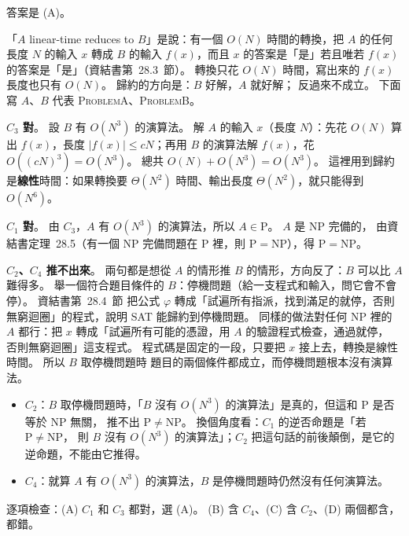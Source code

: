 \begin{pastsoln}
答案是 (A)。

「$A$ linear-time reduces to $B$」是說：有一個 $O(N)$ 時間的轉換，把 $A$ 的任何長度 $N$ 的輸入 $x$
轉成 $B$ 的輸入 $f(x)$，而且 $x$ 的答案是「是」若且唯若 $f(x)$ 的答案是「是」（資結書第~28.3~節）。
轉換只花 $O(N)$ 時間，寫出來的 $f(x)$ 長度也只有 $O(N)$。 歸約的方向是：$B$ 好解，$A$ 就好解；
反過來不成立。 下面寫 $A$、$B$ 代表 \textsc{ProblemA}、\textsc{ProblemB}。

\textbf{$C_3$ 對}。 設 $B$ 有 $O(N^3)$ 的演算法。 解 $A$ 的輸入 $x$（長度 $N$）：先花 $O(N)$ 算出
$f(x)$，長度 $|f(x)| \le cN$；再用 $B$ 的演算法解 $f(x)$，花 $O((cN)^3) = O(N^3)$。 總共
$O(N) + O(N^3) = O(N^3)$。 這裡用到歸約是\textbf{線性}時間：如果轉換要 $\Theta(N^2)$ 時間、輸出長度
$\Theta(N^2)$，就只能得到 $O(N^6)$。

\textbf{$C_1$ 對}。 由 $C_3$，$A$ 有 $O(N^3)$ 的演算法，所以 $A \in \mathrm{P}$。 $A$ 是 NP 完備的，
由資結書定理~28.5（有一個 NP 完備問題在 P 裡，則 $\mathrm{P} = \mathrm{NP}$），得
$\mathrm{P} = \mathrm{NP}$。

\textbf{$C_2$、$C_4$ 推不出來}。 兩句都是想從 $A$ 的情形推 $B$ 的情形，方向反了：$B$ 可以比 $A$
難得多。 舉一個符合題目條件的 $B$：停機問題（給一支程式和輸入，問它會不會停）。 資結書第~28.4~節
把公式 $\varphi$ 轉成「試遍所有指派，找到滿足的就停，否則無窮迴圈」的程式，說明 SAT 能歸約到停機問題。
同樣的做法對任何 NP 裡的 $A$ 都行：把 $x$ 轉成「試遍所有可能的憑證，用 $A$ 的驗證程式檢查，通過就停，
否則無窮迴圈」這支程式。 程式碼是固定的一段，只要把 $x$ 接上去，轉換是線性時間。 所以 $B$ 取停機問題時
題目的兩個條件都成立，而停機問題根本沒有演算法。
\begin{itemize}
\item $C_2$：$B$ 取停機問題時，「$B$ 沒有 $O(N^3)$ 的演算法」是真的，但這和 P 是否等於 NP 無關，
推不出 $\mathrm{P} \ne \mathrm{NP}$。 換個角度看：$C_1$ 的逆否命題是「若 $\mathrm{P} \ne \mathrm{NP}$，
則 $B$ 沒有 $O(N^3)$ 的演算法」；$C_2$ 把這句話的前後顛倒，是它的逆命題，不能由它推得。
\item $C_4$：就算 $A$ 有 $O(N^3)$ 的演算法，$B$ 是停機問題時仍然沒有任何演算法。
\end{itemize}

逐項檢查：(A) $C_1$ 和 $C_3$ 都對，選 (A)。 (B) 含 $C_4$、(C) 含 $C_2$、(D) 兩個都含，都錯。
\end{pastsoln}

